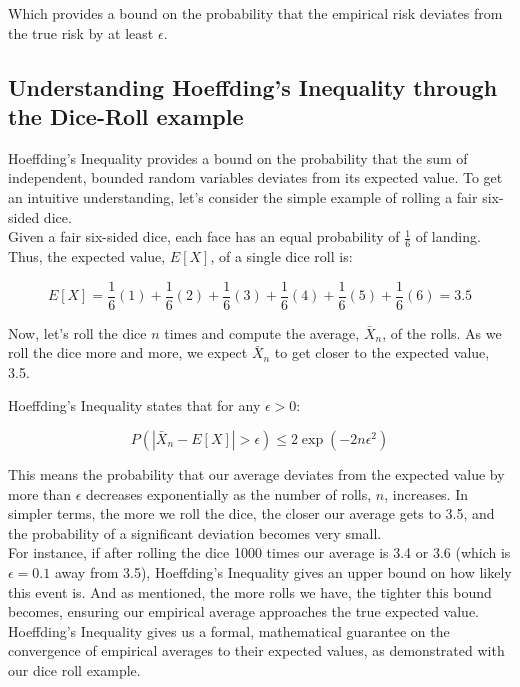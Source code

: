 Which provides a bound on the probability that the empirical risk deviates from the true risk by at least \(\epsilon\).

\subsection{Understanding Hoeffding's Inequality through the Dice-Roll example}

Hoeffding's Inequality provides a bound on the probability that the sum of independent, bounded random variables deviates from its expected value. To get an intuitive understanding, let's consider the simple example of rolling a fair six-sided dice.\\


Given a fair six-sided dice, each face has an equal probability of $\frac{1}{6}$ of landing. Thus, the expected value, \( E[X] \), of a single dice roll is:

\[ E[X] = \frac{1}{6}(1) + \frac{1}{6}(2) + \frac{1}{6}(3) + \frac{1}{6}(4) + \frac{1}{6}(5) + \frac{1}{6}(6) = 3.5 \]


Now, let's roll the dice \( n \) times and compute the average, \( \bar{X}_n \), of the rolls. As we roll the dice more and more, we expect \( \bar{X}_n \) to get closer to the expected value, 3.5.

Hoeffding's Inequality states that for any \( \epsilon > 0 \):

\[ P(|\bar{X}_n - E[X]| > \epsilon) \leq 2 \exp\left(-2n\epsilon^2\right) \]

This means the probability that our average deviates from the expected value by more than \( \epsilon \) decreases exponentially as the number of rolls, \( n \), increases. In simpler terms, the more we roll the dice, the closer our average gets to 3.5, and the probability of a significant deviation becomes very small.\\

For instance, if after rolling the dice 1000 times our average is 3.4 or 3.6 (which is \( \epsilon = 0.1 \) away from 3.5), Hoeffding's Inequality gives an upper bound on how likely this event is. And as mentioned, the more rolls we have, the tighter this bound becomes, ensuring our empirical average approaches the true expected value.\\

Hoeffding's Inequality gives us a formal, mathematical guarantee on the convergence of empirical averages to their expected values, as demonstrated with our dice roll example.






